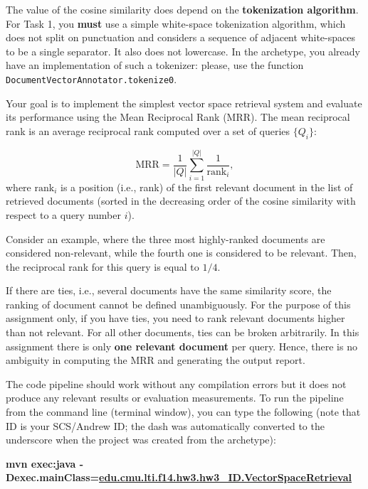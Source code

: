 \documentclass[oneside,11pt]{memoir}
\begin{document}
The value of the cosine similarity does depend on the \textbf{tokenization algorithm}.
For Task 1, you \textbf{must} use a simple white-space tokenization algorithm,
which does not split on punctuation and considers a sequence of 
adjacent white-spaces to be a single separator.
It also  does not lowercase.
In the archetype, you already have an implementation of such a tokenizer:
please, use the function \texttt{DocumentVectorAnnotator.tokenize0}.

Your goal is to implement the simplest vector space retrieval system
and evaluate its performance using the Mean Reciprocal Rank (MRR).  
The mean reciprocal rank is an average reciprocal rank
computed over a set of queries $\{Q_i\}$:

\begin{equation}\label{EqMRR}
\mbox{MRR} = \frac{1}{|Q|}\sum\limits_{i=1}^{|Q|} \frac{1} {\mbox{rank}_i},
\end{equation}
where $\mbox{rank}_i$ is a position (i.e., rank) of the first relevant document
in the list of retrieved documents (sorted in the decreasing order of the cosine similarity with respect to a query number $i$).

Consider an example, where the three most highly-ranked documents are considered 
non-relevant, while the fourth one is considered to be relevant. 
Then, the reciprocal rank for this query is equal to $1/4$.

If there are ties, i.e., several documents have the same
similarity score,
the ranking of document cannot be defined unambiguously.
For the purpose of this assignment only, if you have ties,
you need to rank relevant documents higher than not relevant. 
For all other documents, ties can be broken arbitrarily.
In this assignment there is only \textbf{one relevant document} per query.
Hence, there is no ambiguity in computing the MRR and generating the output report.


The code pipeline should work without any compilation errors but it does not produce any relevant results or evaluation measurements.
To run the pipeline from the command line (terminal window), you can type the following
(note that ID is your SCS/Andrew ID; the dash was automatically converted to the underscore when the project was created from the archetype):

\begin{center}\small\textbf{mvn exec:java 
       -Dexec.mainClass=\url{edu.cmu.lti.f14.hw3.hw3_ID.VectorSpaceRetrieval}}\end{center}
\end{document}
